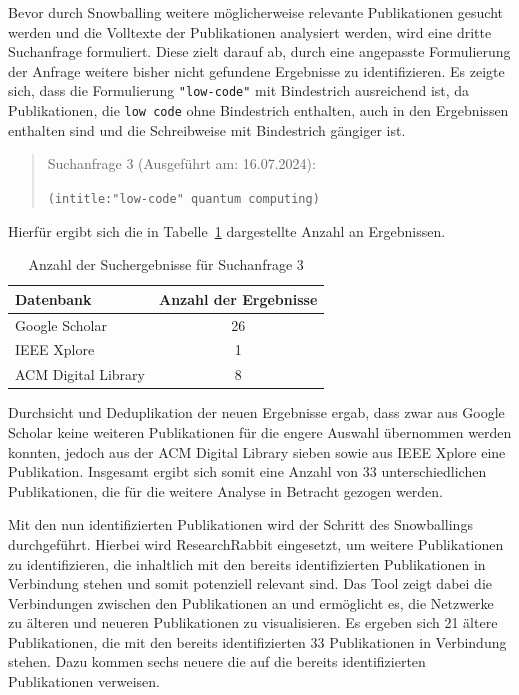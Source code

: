 Bevor durch Snowballing weitere möglicherweise relevante Publikationen gesucht werden und die Volltexte der Publikationen analysiert werden, 
wird eine dritte Suchanfrage formuliert. Diese zielt darauf ab, durch eine angepasste Formulierung der Anfrage weitere bisher nicht gefundene 
Ergebnisse zu identifizieren. Es zeigte sich, dass die Formulierung \texttt{"low-code"} mit Bindestrich ausreichend ist, da Publikationen, die
\texttt{low code} ohne Bindestrich enthalten, auch in den Ergebnissen enthalten sind und die Schreibweise mit Bindestrich gängiger ist. 

\begin{quote}
    Suchanfrage 3 (Ausgeführt am: 16.07.2024):

    \texttt{(intitle:"low-code" quantum computing)} 

\end{quote}

Hierfür ergibt sich die in Tabelle~\ref{tab:search_3_results} dargestellte Anzahl an Ergebnissen. 

\begin{table}[h!]
    \centering
    \caption{Anzahl der Suchergebnisse für Suchanfrage 3}
    \label{tab:search_3_results}
    \begin{tabular}{|l|c|}
    \hline
    \textbf{Datenbank} & \textbf{Anzahl der Ergebnisse} \\ \hline
    Google Scholar & 26 \\ \hline
    IEEE Xplore & 1 \\ \hline
    ACM Digital Library & 8 \\ \hline
    \end{tabular}
\end{table}

Durchsicht und Deduplikation der neuen Ergebnisse ergab, dass zwar aus Google Scholar keine weiteren Publikationen für die engere Auswahl übernommen werden konnten, 
jedoch aus der ACM Digital Library sieben sowie aus IEEE Xplore eine Publikation. Insgesamt ergibt sich somit eine Anzahl von 33 
unterschiedlichen Publikationen, die für die weitere Analyse in Betracht gezogen werden. 

Mit den nun identifizierten Publikationen wird der Schritt des Snowballings durchgeführt. Hierbei wird ResearchRabbit eingesetzt, um 
weitere Publikationen zu identifizieren, die inhaltlich mit den bereits identifizierten Publikationen in Verbindung stehen und somit 
potenziell relevant sind. Das Tool zeigt dabei die Verbindungen zwischen den Publikationen an und ermöglicht es, die Netzwerke 
zu älteren und neueren Publikationen zu visualisieren. Es ergeben sich 21 ältere Publikationen, die mit den bereits identifizierten 33 
Publikationen in Verbindung stehen. Dazu kommen sechs neuere die auf die bereits identifizierten Publikationen verweisen. 


